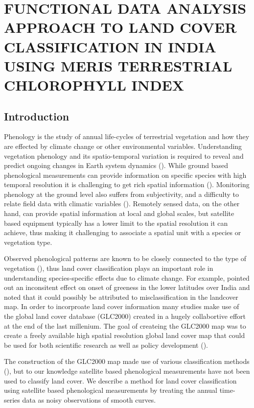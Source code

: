 

\chapter{FUNCTIONAL DATA ANALYSIS APPROACH TO LAND COVER CLASSIFICATION IN INDIA USING MERIS TERRESTRIAL CHLOROPHYLL INDEX} \label{phenology}

\section{Introduction}

Phenology is the study of annual life-cycles of terrestrial vegetation and how they are effected by climate change or other environmental variables. Understanding vegetation phenology and its spatio-temporal variation is required to reveal and predict ongoing changes in Earth system dynamics (\cite{Jeganathan:2010gqa}). While ground based phenological measurements can provide information on specific species with high temporal resolution it is challenging to get rich spatial information (\cite{Studer:2007hd}). Monitoring phenology at the ground level also suffers from subjectivity, and a difficulty to relate field data with climatic variables (\cite{Jeganathan:2010gqa}). Remotely sensed data, on the other hand, can provide spatial information at local and global scales, but satellite based equipment typically has a lower limit to the spatial resolution it can achieve, thus making it challenging to associate a spatial unit with a species or vegetation type. 

Observed phenological patterns are known to be closely connected to the type of vegetation (\cite{Dash:2010kva}), thus land cover classification plays an important role in understanding species-specific effects due to climate change. For example, \cite{Dash:2010kva} pointed out an inconsitent effect on onset of greeness in the lower latitudes over India and noted that it could possibly be attributed to misclassification in the landcover map. In order to incorproate land cover information many studies make use of the global land cover database (GLC2000) created in a hugely collabortive effort at the end of the last millenium. The goal of createing the GLC2000 map was to create a freely available high spatial resolution global land cover map that could be used for both scientific research as well as policy development (\cite{Bartholome:2005cq}). 

The construction of the GLC2000 map made use of various classification methods (\cite{Dash:2010kva}), but to our knowledge satellite based phenological measurements have not been used to classify land cover. We describe a method for land cover classification using satellite based phenological measurements by treating the annual time-series data as noisy observations of smooth curves. 

